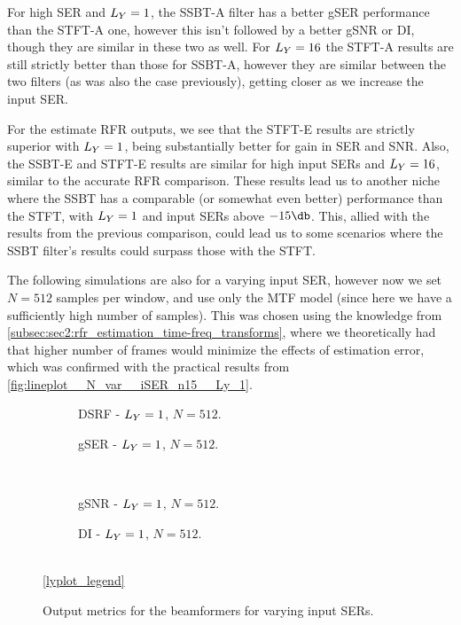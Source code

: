For high SER and $\Ly = 1$, the SSBT-A filter has a better gSER performance than the STFT-A one, however this isn't followed by a better gSNR or DI, though they are similar in these two as well. For $\Ly = 16$ the STFT-A results are still strictly better than those for SSBT-A, however they are similar between the two filters (as was also the case previously), getting closer as we increase the input SER.

For the estimate RFR outputs, we see that the STFT-E results are strictly superior with $\Ly = 1$, being substantially better for gain in SER and SNR. Also, the SSBT-E and STFT-E results are similar for high input SERs and $\Ly = 16$, similar to the accurate RFR comparison. These results lead us to another niche where the SSBT has a comparable (or somewhat even better) performance than the STFT, with $\Ly = 1$ and input SERs above $-15\dB$. This, allied with the results from the previous comparison, could lead us to some scenarios where the SSBT filter's results could surpass those with the STFT.

The following simulations are also for a varying input SER, however now we set $N = 512$ samples per window, and use only the MTF model (since here we have a sufficiently high number of samples). This was chosen using the knowledge from \cref{subsec:sec2:rfr_estimation_time-freq_transforms}, where we theoretically had that higher number of frames would minimize the effects of estimation error, which was confirmed with the practical results from \cref{fig:lineplot__N_var__iSER_n15__Ly_1}.

\begin{figure}[!ht]
	\centering
	\begin{subfigure}{0.49\textwidth}
		\centering
		
		\caption{DSRF - $\Ly = 1$, $N = 512$.}
		\label{subfig:lineplot__DSRF__N_512__iSER_var__Ly_1}
	\end{subfigure}\hfill
	\begin{subfigure}{0.49\textwidth}
		\centering
		
		\caption{gSER - $\Ly = 1$, $N = 512$.}
		\label{subfig:lineplot__gSER__N_512__iSER_var__Ly_1}
	\end{subfigure}\\[1em]
	\begin{subfigure}{0.49\textwidth}
		\centering
		
		\caption{gSNR - $\Ly = 1$, $N = 512$.}
		\label{subfig:lineplot__gSNR__N_512__iSER_var__Ly_1}
	\end{subfigure}\hfill
	\begin{subfigure}{0.49\textwidth}
		\centering
		
		\caption{DI - $\Ly = 1$, $N = 512$.}
		\label{subfig:lineplot__DI__N_512__iSER_var__Ly_1}
	\end{subfigure}\\[1em]
	\ref*{lyplot_legend}
	\caption{Output metrics for the beamformers for varying input SERs.}
	\label{fig:lineplot__N_512__iSER_var__Ly_1}
\end{figure}

